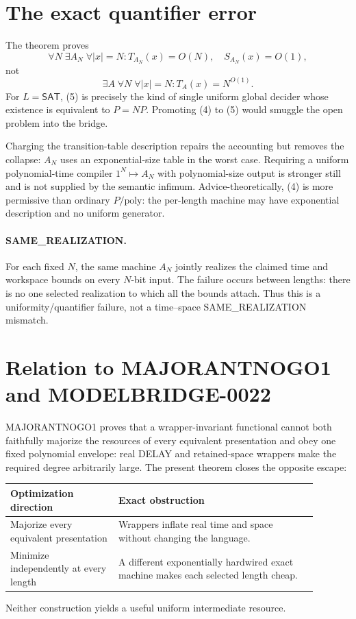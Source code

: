 \documentclass[11pt]{article}
\newcommand{\SAT}{\mathsf{SAT}}
\begin{document}
\section{The exact quantifier error}

The theorem proves
\[
 \forall N\;\exists A_N\;\forall |x|=N:
       T_{A_N}(x)=O(N),\quad S_{A_N}(x)=O(1),
 \tag{4}
\]
not
\[
 \exists A\;\forall N\;\forall |x|=N:
       T_A(x)=N^{O(1)}.
 \tag{5}
\]
For \(L=\SAT\), (5) is precisely the kind of single uniform global decider
whose existence is equivalent to \(P=NP\).  Promoting (4) to (5) would
smuggle the open problem into the bridge.

Charging the transition-table description repairs the accounting but removes
the collapse: \(A_N\) uses an exponential-size table in the worst case.
Requiring a uniform polynomial-time compiler \(1^N\mapsto A_N\) with
polynomial-size output is stronger still and is not supplied by the semantic
infimum.  Advice-theoretically, (4) is more permissive than ordinary
\(P/\mathrm{poly}\): the per-length machine may have exponential description
and no uniform generator.

\paragraph{SAME\_REALIZATION.}
For each fixed \(N\), the same machine \(A_N\) jointly realizes the claimed
time and workspace bounds on every \(N\)-bit input.  The failure occurs
between lengths: there is no one selected realization to which all the
bounds attach.  Thus this is a uniformity/quantifier failure, not a
time--space SAME\_REALIZATION mismatch.

\section{Relation to MAJORANTNOGO1 and MODELBRIDGE-0022}

MAJORANTNOGO1 proves that a wrapper-invariant functional cannot both
faithfully majorize the resources of every equivalent presentation and obey
one fixed polynomial envelope: real DELAY and retained-space wrappers make
the required degree arbitrarily large.  The present theorem closes the
opposite escape:
\begin{center}
\begin{tabular}{p{0.31\linewidth}p{0.58\linewidth}}
\toprule
Optimization direction & Exact obstruction \\
\midrule
Majorize every equivalent presentation & Wrappers inflate real time and space without changing the language.\\
Minimize independently at every length & A different exponentially hardwired exact machine makes each selected length cheap.\\
\bottomrule
\end{tabular}
\end{center}
Neither construction yields a useful uniform intermediate resource.
\end{document}
